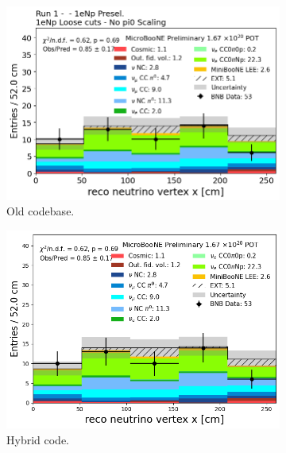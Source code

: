 \begin{figure}[H]
    \centering
    \begin{subfigure}[t]{0.32\linewidth}
        \includegraphics[width=\linewidth]{technote/Appendix_Validation/Figures/1eNp_Loose/Run1_Vertex_X_Old.png}
        \caption{Old codebase.}
    \end{subfigure}%
    \hspace{0.2cm}%
    \begin{subfigure}[t]{0.32\linewidth}
        \includegraphics[width=\linewidth]{technote/Appendix_Validation/Figures/1eNp_Loose/Run1_Vertex_X_Chris.png}
        \caption{Hybrid code.}
    \end{subfigure}%
    \hspace{0.2cm}%
    \begin{subfigure}[t]{0.32\linewidth}

\end{subfigure}
\end{figure}
